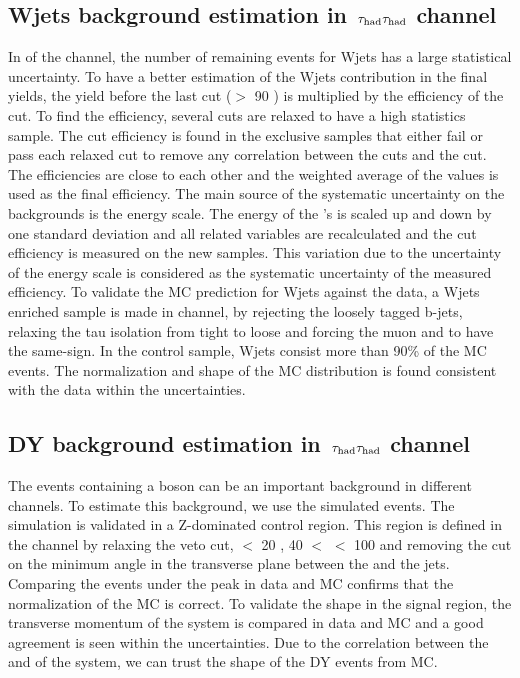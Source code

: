 \subsection{\texorpdfstring{Wjets background estimation in $\,\tau_{\rm had}\tau_{\rm had}$ channel}{Wjets background estimation in tau-tau channel}}
In \binone of the \tauTau channel, the number of remaining events for Wjets has a large statistical uncertainty. 
To have a better estimation of the Wjets contribution in the final yields,
the yield before the last cut (\mttwo $>$ 90 \GeV) is multiplied by the efficiency of the cut. To find the efficiency, several cuts are relaxed 
to have a high statistics sample. The cut efficiency is found in the exclusive samples that either fail or pass each relaxed cut
to remove any correlation between the cuts and the \mttwo cut.
The efficiencies are close to each other and the weighted average of the values is used as the final efficiency.
The main source of the systematic uncertainty on the backgrounds 
is the \Tau energy scale. The energy of the \Tau's is scaled up and down by one standard deviation and all related variables are 
recalculated and the cut efficiency is measured on the new samples. 
This variation due to the uncertainty of the \Tau energy scale is considered as the systematic uncertainty of the measured efficiency.
To validate the MC prediction for Wjets against the data, a Wjets enriched sample is made in \muTau channel, 
by rejecting the loosely tagged b-jets, relaxing the tau isolation from tight to loose and forcing the muon and \Tau to have the same-sign. 
In the control sample, Wjets consist more than 90\% of the MC events. The normalization and shape of the MC distribution  is found consistent
with the data within the uncertainties.

\subsection{\texorpdfstring{DY background estimation in $\,\tau_{\rm had}\tau_{\rm had}$ channel}{DY background estimation in tau-tau channel}}
The events containing a \Z boson can be an important background in different channels. To
estimate this background, we use the simulated events. The simulation
is validated in a Z-dominated control region.
This region is defined in the \muTau channel by relaxing  the \Z veto cut, \mttwo $<$ 20 \GeV, 40 $<$ \tauMT $<$ 100 \GeV and 
removing the cut on the minimum angle in the transverse plane between the \MET and the jets. Comparing the events under the \Z peak in data and MC 
confirms that the normalization of the  MC is correct. To validate the shape in the signal region, the transverse momentum of the \Z system is compared in data 
and MC  and a good agreement is seen within the uncertainties. Due to the correlation between the \mttwo and \pt of the \Z system, we can trust the shape of the 
DY events from MC.


